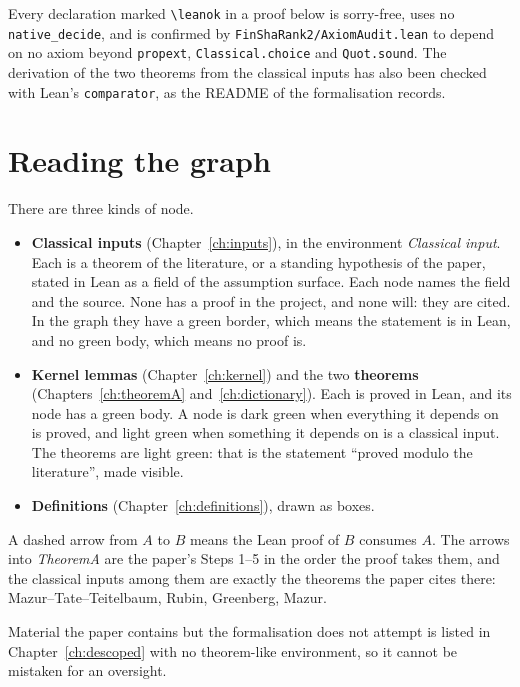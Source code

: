 Every declaration marked \texttt{\textbackslash leanok} in a proof below is
sorry-free, uses no \texttt{native\_decide}, and is confirmed by
\texttt{FinShaRank2/AxiomAudit.lean} to depend on no axiom beyond
\texttt{propext}, \texttt{Classical.choice} and \texttt{Quot.sound}. The
derivation of the two theorems from the classical inputs has also been
checked with Lean's \texttt{comparator}, as the README of the formalisation
records.

\section{Reading the graph}
\label{sec:reading}

There are three kinds of node.

\begin{itemize}
  \item \textbf{Classical inputs} (Chapter~\ref{ch:inputs}), in the
    environment \emph{Classical input}. Each is a theorem of the literature,
    or a standing hypothesis of the paper, stated in Lean as a field of the
    assumption surface. Each node names the field and the source. None has
    a proof in the project, and none will: they are cited. In the graph they
    have a green border, which means the statement is in Lean, and no green
    body, which means no proof is.
  \item \textbf{Kernel lemmas} (Chapter~\ref{ch:kernel}) and the two
    \textbf{theorems} (Chapters~\ref{ch:theoremA} and~\ref{ch:dictionary}).
    Each is proved in Lean, and its node has a green body. A node is dark
    green when everything it depends on is proved, and light green when
    something it depends on is a classical input. The theorems are light
    green: that is the statement ``proved modulo the literature'', made
    visible.
  \item \textbf{Definitions} (Chapter~\ref{ch:definitions}), drawn as
    boxes.
\end{itemize}

A dashed arrow from $A$ to $B$ means the Lean proof of $B$ consumes $A$. The
arrows into \emph{TheoremA} are the paper's Steps 1--5 in the order the
proof takes them, and the classical inputs among them are exactly the
theorems the paper cites there: Mazur--Tate--Teitelbaum, Rubin, Greenberg,
Mazur.

Material the paper contains but the formalisation does not attempt is
listed in Chapter~\ref{ch:descoped} with no theorem-like environment, so it
cannot be mistaken for an oversight.

